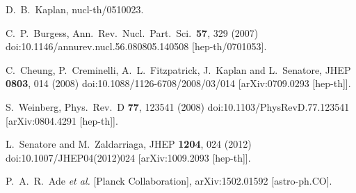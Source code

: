 \documentclass[useAMS,12pt]{article}
\begin{document}
\begingroup
\renewcommand{\section}[2]{}%
\begin{thebibliography}{}

  D.~B.~Kaplan,
  nucl-th/0510023.


  C.~P.~Burgess,
  Ann.\ Rev.\ Nucl.\ Part.\ Sci.\  {\bf 57}, 329 (2007)
  doi:10.1146/annurev.nucl.56.080805.140508
  [hep-th/0701053].


  C.~Cheung, P.~Creminelli, A.~L.~Fitzpatrick, J.~Kaplan and L.~Senatore,
  JHEP {\bf 0803}, 014 (2008)
  doi:10.1088/1126-6708/2008/03/014
  [arXiv:0709.0293 [hep-th]].


  S.~Weinberg,
  Phys.\ Rev.\ D {\bf 77}, 123541 (2008)
  doi:10.1103/PhysRevD.77.123541
  [arXiv:0804.4291 [hep-th]].


  L.~Senatore and M.~Zaldarriaga,
  JHEP {\bf 1204}, 024 (2012)
  doi:10.1007/JHEP04(2012)024
  [arXiv:1009.2093 [hep-th]].


  P.~A.~R.~Ade {\it et al.} [Planck Collaboration],
  arXiv:1502.01592 [astro-ph.CO].



\end{thebibliography}
\end{document}
